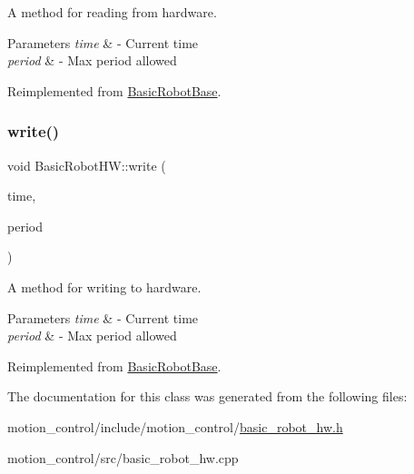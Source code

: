 A method for reading from hardware. 


\begin{DoxyParams}{Parameters}
{\em time} & -\/ Current time \\
\hline
{\em period} & -\/ Max period allowed \\
\hline
\end{DoxyParams}


Reimplemented from \hyperlink{classBasicRobotBase_a64bb2c7bed72e98fb62a37d6beb4fe5a}{Basic\+Robot\+Base}.

\mbox{\label{classBasicRobotHW_ad98c52f214593f8d59b1df93b1155c74}} 
\subsubsection{\texorpdfstring{write()}{write()}}
{\footnotesize\ttfamily void Basic\+Robot\+H\+W\+::write (\begin{DoxyParamCaption}\item[{const ros\+::\+Time \&}]{time,  }\item[{const ros\+::\+Duration \&}]{period }\end{DoxyParamCaption})\hspace{0.3cm}{\ttfamily [virtual]}}



A method for writing to hardware. 


\begin{DoxyParams}{Parameters}
{\em time} & -\/ Current time \\
\hline
{\em period} & -\/ Max period allowed \\
\hline
\end{DoxyParams}


Reimplemented from \hyperlink{classBasicRobotBase_afbc6ef4347fc05e053391692a9e1bc24}{Basic\+Robot\+Base}.



The documentation for this class was generated from the following files\+:\begin{DoxyCompactItemize}
\item 
motion\+\_\+control/include/motion\+\_\+control/\hyperlink{basic__robot__hw_8h}{basic\+\_\+robot\+\_\+hw.\+h}\item 
motion\+\_\+control/src/basic\+\_\+robot\+\_\+hw.\+cpp\end{DoxyCompactItemize}

